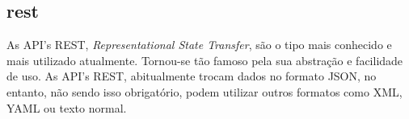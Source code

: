 \subsection{rest}
As API's REST, \textit{Representational State Transfer}, são o tipo mais conhecido e mais utilizado atualmente. Tornou-se tão famoso pela sua abstração e facilidade de uso.\newline
As API's REST, abitualmente trocam dados no formato JSON, no entanto, não sendo isso obrigatório, podem utilizar outros formatos como XML, YAML ou texto normal.
